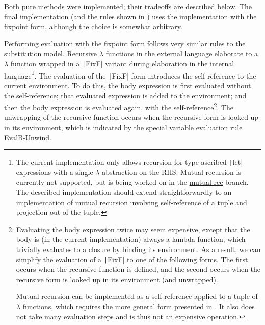 Both pure methods were implemented; their tradeoffs are described below. The final implementation (and the rules shown in ) uses the implementation with the fixpoint form, although the choice is somewhat arbitrary.

Performing evaluation with the fixpoint form follows very similar rules to the substitution model. Recursive $\lambda$ functions in the external language elaborate to a $\lambda$ function wrapped in a \texttt|FixF| variant during elaboration in the internal language\footnote{The current implementation only allows recursion for type-ascribed \texttt|let| expressions with a single $\lambda$ abstraction on the RHS. Mutual recursion is currently not supported, but is being worked on in the \href{https://github.com/hazelgrove/hazel/tree/mutual-rec}{mutual-rec} branch. The described implementation should extend straightforwardly to an implementation of mutual recursion involving self-reference of a tuple and projection out of the tuple.}. The evaluation of the \texttt|FixF| form introduces the self-reference to the current environment. To do this, the body expression is first evaluated without the self-reference; that evaluated expression is added to the environment; and then the body expression is evaluated again, with the self-reference\footnote{Evaluating the body expression twice may seem expensive, except that the body is (in the current implementation) always a lambda function, which trivially evaluates to a closure by binding its environment. As a result, we can simplify the evaluation of a \texttt|FixF| to one of the following forms. The first occurs when the recursive function is defined, and the second occurs when the recursive form is looked up in its environment (and unwrapped).
  Mutual recursion can be implemented as a self-reference applied to a tuple of $\lambda$ functions, which requires the more general form presented in . It also does not take many evaluation steps and is thus not an expensive operation.}. The unwrapping of the recursive function occurs when the recursive form is looked up in its environment, which is indicated by the special variable evaluation rule EvalB-Unwind.

